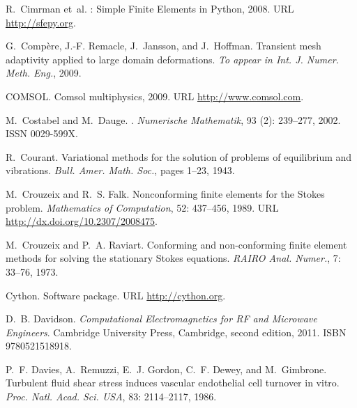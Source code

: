 \begin{thebibliography}{467}
R.~Cimrman et~al.
: {S}imple {F}inite {E}lements in {P}ython, 2008.
\newblock URL \url{http://sfepy.org}.

G.~Comp\`{e}re, J.-F. Remacle, J.~Jansson, and J.~Hoffman.
\newblock Transient mesh adaptivity applied to large domain deformations.
\newblock \emph{To appear in Int. J. Numer. Meth. Eng.}, 2009.

COMSOL.
\newblock Comsol multiphysics, 2009.
\newblock URL \url{http://www.comsol.com}.

M.~Costabel and M.~Dauge.
.
\newblock \emph{Numerische Mathematik}, 93 (2): 239--277,
  2002.
\newblock ISSN 0029-599X.

R.~Courant.
\newblock Variational methods for the solution of problems of equilibrium and
  vibrations.
\newblock \emph{Bull. Amer. Math. Soc.}, pages 1--23, 1943.

M.~Crouzeix and R.~S. Falk.
\newblock Nonconforming finite elements for the {S}tokes problem.
\newblock \emph{Mathematics of Computation}, 52: 437--456, 1989.
\newblock URL \url{http://dx.doi.org/10.2307/2008475}.

M.~Crouzeix and P.~A. Raviart.
\newblock Conforming and non-conforming finite element methods for solving the
  stationary {S}tokes equations.
\newblock \emph{RAIRO Anal. Numer.}, 7: 33--76, 1973.

Cython.
\newblock Software package.
\newblock URL \url{http://cython.org}.

D.~B. Davidson.
\newblock \emph{Computational Electromagnetics for RF and Microwave Engineers}.
\newblock Cambridge University Press, Cambridge, second edition, 2011.
\newblock ISBN 9780521518918.

P.~F. Davies, A.~Remuzzi, E.~J. Gordon, C.~F. Dewey, and M.~Gimbrone.
\newblock Turbulent fluid shear stress induces vascular endothelial cell
  turnover in vitro.
\newblock \emph{Proc. Natl. Acad. Sci. USA}, 83: 2114--2117, 1986.


\end{thebibliography}
